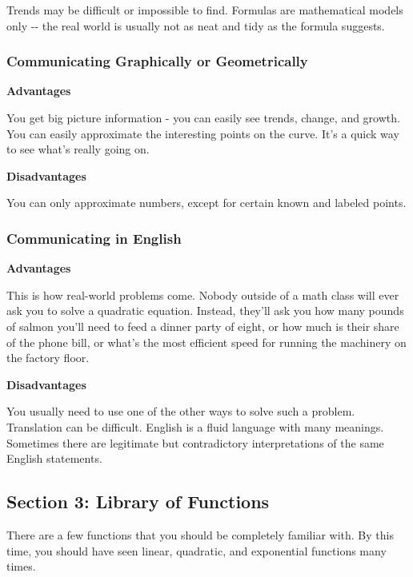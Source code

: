 Trends may be difficult or impossible to find. Formulas are mathematical
models only -\/- the real world is usually not as neat and tidy as the
formula suggests.

\subsubsection{Communicating Graphically or Geometrically
}\label{communicating-graphically-or-geometrically}

\textbf{Advantages }

You get big picture information - you can easily see trends, change, and
growth. You can easily approximate the interesting points on the curve.
It's a quick way to see what's really going on.

\textbf{Disadvantages}

You can only approximate numbers, except for certain known and labeled
points.

\subsubsection{Communicating in English
}\label{communicating-in-english}

\textbf{Advantages }

This is how real-world problems come. Nobody outside of a math class
will ever ask you to solve a quadratic equation. Instead, they'll ask
you how many pounds of salmon you'll need to feed a dinner party of
eight, or how much is their share of the phone bill, or what's the most
efficient speed for running the machinery on the factory floor.

\textbf{Disadvantages}

You usually need to use one of the other ways to solve such a problem.
Translation can be difficult. English is a fluid language with many
meanings. Sometimes there are legitimate but contradictory
interpretations of the same English statements.

\hypertarget{section-3-library-of-functions}{\subsection{Section 3:
Library of Functions}\label{section-3-library-of-functions}}

There are a few functions that you should be completely familiar with.
By this time, you should have seen linear, quadratic, and exponential
functions many times.

